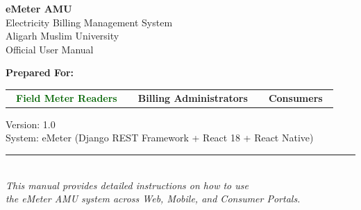 \documentclass[12pt, a4paper]{report}
\begin{document}
\begin{titlepage}
    \centering
    \vspace*{2cm}
    
    \begin{tcolorbox}[
        colback=deepBlue, colframe=primaryGreen,
        width=\textwidth, arc=8pt, boxrule=2pt
    ]
        \centering
        \vspace{0.5cm}
        {\Huge\bfseries\color{primaryGreen} eMeter AMU}\\[0.4cm]
        {\Large\color{white} Electricity Billing Management System}\\[0.3cm]
        {\large\color{lightGreen} Aligarh Muslim University}\\[0.2cm]
        {\normalsize\color{borderColor} Official User Manual}
        \vspace{0.5cm}
    \end{tcolorbox}
    
    \vspace{1.5cm}
    
    {\large\bfseries\color{textMid} Prepared For:}\\[0.4cm]
    \begin{tabular}{c c c}
        \colorbox{primaryGreen!15}{\textcolor{darkGreen}{\textbf{\ Field Meter Readers\ }}}
        &
        \colorbox{deepBlue!10}{\textcolor{deepBlue}{\textbf{\ Billing Administrators\ }}}
        &
        \colorbox{accentAmber!20}{\textcolor{accentAmber!80!black}{\textbf{\ Consumers\ }}}
    \end{tabular}
    
    \vfill
    
    {\small\color{textMid}
        Version: 1.0\\
        System: eMeter (Django REST Framework + React 18 + React Native)\\[0.3cm]
        \textcolor{borderColor}{\rule{6cm}{0.4pt}}\\[0.3cm]
        \textit{This manual provides detailed instructions on how to use\\
        the eMeter AMU system across Web, Mobile, and Consumer Portals.}
    }
\end{titlepage}

\tableofcontents

\newpage

\end{document}
